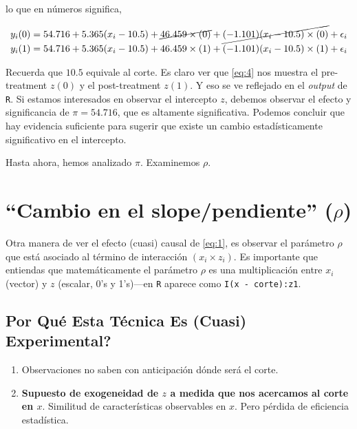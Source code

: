 \documentclass[10pt]{article}
\begin{document}
lo que en n\'umeros significa,

\begin{equation} \label{eq:4}
\begin{split}
y_{i}(0) &= 54.716 + 5.365(x_{i}-10.5) + \cancel{46.459\times(0)} + \cancel{(-1.101)(x_{i}-10.5) \times (0)} +  \epsilon_{i} \\
y_{i}(1) &= 54.716 + 5.365(x_{i}-10.5) + 46.459\times(1) + (-1.101)(x_{i}-10.5) \times (1) +  \epsilon_{i}
\end{split}
\end{equation}


Recuerda que $10.5$ equivale al corte. Es claro ver que \autoref{eq:4} nos muestra el pre-treatment $z(0)$ y el post-treatment $z(1)$. Y eso se ve reflejado en el \emph{output} de \texttt{R}. Si estamos interesados en observar el intercepto $z$, debemos observar el efecto y significancia de $\pi=54.716$, que es altamente significativa. Podemos concluir que hay evidencia suficiente para sugerir que existe un cambio estad\'isticamente significativo en el intercepto.

Hasta ahora, hemos analizado $\pi$. Examinemos $\rho$.


\section*{``Cambio en el slope/pendiente'' ($\rho$)}

Otra manera de ver el efecto (cuasi) causal de \autoref{eq:1}, es observar el par\'ametro $\rho$ que est\'a asociado al t\'ermino de interacci\'on $(x_{i}\times z_{i})$. Es importante que entiendas que matem\'aticamente el par\'ametro  $\rho$ es una multiplicaci\'on entre $x_{i}$ (vector) y $z$ (escalar, 0's y 1's)---en \texttt{R} aparece como \texttt{I(x - corte):z1}.


\subsection*{Por Qu\'e Esta T\'ecnica Es (Cuasi) Experimental?}

\begin{enumerate}
	\item Observaciones no saben con anticipaci\'on d\'onde ser\'a el corte.
	\item {\bf Supuesto de exogeneidad de $z$ a medida que nos acercamos al corte en $x$}.  Similitud de caracter\'isticas observables en $x$. Pero p\'erdida de eficiencia estad\'istica.
\end{enumerate}
\end{document}
